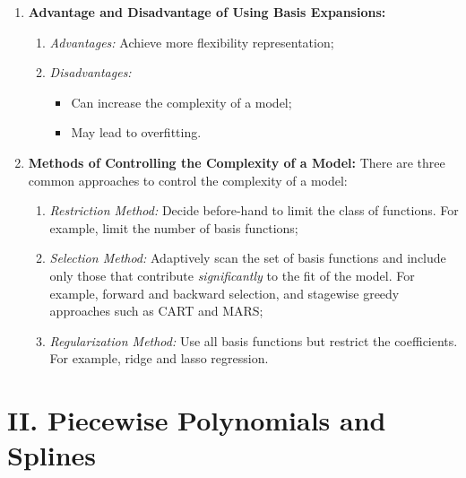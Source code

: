\documentclass[12pt]{article}
\begin{document}
\begin{enumerate}[label=\textbf{\arabic*.}]
	\item \textbf{Advantage and Disadvantage of Using Basis Expansions:} 
	\begin{enumerate}
		\item \textit{Advantages:} Achieve more flexibility representation; 
		\item \textit{Disadvantages:} 
		\begin{itemize}
			\item Can increase the complexity of a model; 
			\item May lead to overfitting. 
		\end{itemize}
	\end{enumerate}
	
	\item \textbf{Methods of Controlling the Complexity of a Model:} There are three common approaches to control the complexity of a model: 
	\begin{enumerate}
		\item \textit{Restriction Method:} Decide before-hand to limit the class of functions. For example, limit the number of basis functions; 
		\item \textit{Selection Method:} Adaptively scan the set of basis functions and include only those that contribute \emph{significantly} to the fit of the model. For example, forward and backward selection, and stagewise greedy approaches such as CART and MARS; 
		\item \textit{Regularization Method:} Use all basis functions but restrict the coefficients. For example, ridge and lasso regression. 
	\end{enumerate}

\end{enumerate}


\section*{II. Piecewise Polynomials and Splines} 
\end{document}
